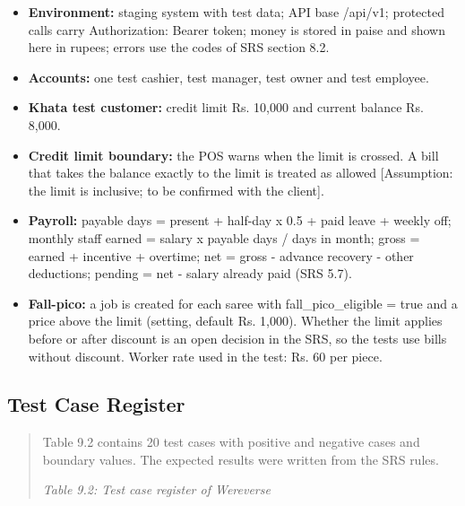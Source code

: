 \documentclass[12pt,a4paper]{article}
\begin{document}
\begin{itemize}
\item
  \textbf{Environment:} staging system with test data; API base /api/v1;
  protected calls carry Authorization: Bearer token; money is stored in
  paise and shown here in rupees; errors use the codes of SRS section
  8.2.
\item
  \textbf{Accounts:} one test cashier, test manager, test owner and test
  employee.
\item
  \textbf{Khata test customer:} credit limit Rs. 10,000 and current
  balance Rs. 8,000.
\item
  \textbf{Credit limit boundary:} the POS warns when the limit is
  crossed. A bill that takes the balance exactly to the limit is treated
  as allowed {[}Assumption: the limit is inclusive; to be confirmed with
  the client{]}.
\item
  \textbf{Payroll:} payable days = present + half-day x 0.5 + paid leave
  + weekly off; monthly staff earned = salary x payable days / days in
  month; gross = earned + incentive + overtime; net = gross - advance
  recovery - other deductions; pending = net - salary already paid (SRS
  5.7).
\item
  \textbf{Fall-pico:} a job is created for each saree with
  fall\_pico\_eligible = true and a price above the limit (setting,
  default Rs. 1,000). Whether the limit applies before or after discount
  is an open decision in the SRS, so the tests use bills without
  discount. Worker rate used in the test: Rs. 60 per piece.
\end{itemize}

\subsection{Test Case Register}\label{test-case-register}

\begin{quote}
Table 9.2 contains 20 test cases with positive and negative cases and
boundary values. The expected results were written from the SRS rules.

\emph{Table 9.2: Test case register of Wereverse}
\end{quote}
\end{document}
